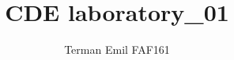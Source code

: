 \documentclass{article}
\begin{document}
	\newcommand{\ROne}{99.8}
	\newcommand{\RTwo}{198}
	\newcommand{\RThree}{53.7}
	\newcommand{\RMax}{473}
	
	\newcommand{\IPosOne}{42.1}
	\newcommand{\IPosTwo}{96.0}

	\newcommand{\UExOneOne}{4.24}
	\newcommand{\UExOneTwo}{8.43}
	\newcommand{\UExOneThree}{2.26}

	\newcommand{\IExTwoOne}{61.7}
	\newcommand{\IExTwoTwo}{43.2}
	\newcommand{\IExTwoThree}{18.6}

	\newcommand{\UExTwoOne}{6.66}
	\newcommand{\UExTwoTwo}{8.69}
	\newcommand{\UExTwoThree}{8.69}

	\makeatletter
	\newenvironment{sqcases} {
		\matrix@check\sqcases\env@sqcases
	}{
		\endarray \right.
	}
	\def\env@sqcases {
		\let \@ifnextchar \new@ifnextchar
		\left \lbrack
		\def \arraystretch{1.2}
		\array{@{}l@{\quad}l@{}}
	}
	\makeatother

	\newcommand{\myIncludeImg}[4]{
		\begin{center} \begin{figure}[H]
			\begin{mdframed}[backgroundcolor=black!5, rightline=false, leftline=false]
				\begin{center}
					\texttt{[image: \#2]}
					\caption{#3}
				\end{center}
			\end{mdframed}
			\label{fig:#4}
		\end{figure} \end{center}
	}


	\title{CDE laboratory\_01}
	\author{Terman Emil FAF161}
	\maketitle

	\vspace*{\fill}
	
\end{document}

